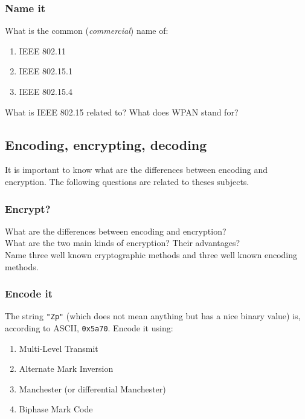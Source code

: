 \documentclass[11pt]{article}
\begin{document}
\subsubsection{Name it}
What is the common (\emph{commercial}) name of:
  \begin{enumerate}
    \item IEEE 802.11   %
    \item IEEE 802.15.1 %
    \item IEEE 802.15.4 %
  \end{enumerate}
What is IEEE 802.15 related to? What does WPAN stand for? %

\subsection{Encoding, encrypting, decoding}
It is important to know what are the differences between encoding and encryption. The following questions are related to theses subjects.
\subsubsection{Encrypt?}
What are the differences between encoding and encryption?\\     %
What are the two main kinds of encryption? Their advantages?\\  %
Name three well known cryptographic methods and three well known encoding methods. %

\subsubsection{Encode it}
The string \verb$"Zp"$ (which does not mean anything but has a nice binary value) is, according to ASCII, \verb$0x5a70$. Encode it using:
  \begin{enumerate}
    \item Multi-Level Transmit
    \item Alternate Mark Inversion
    \item Manchester (or differential Manchester)
    \item Biphase Mark Code
  \end{enumerate}
\end{document}
